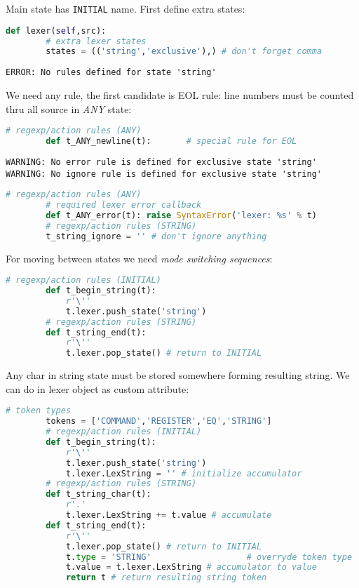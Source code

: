 Main state has \verb|INITIAL| name. First define extra states:
\begin{lstlisting}[language=python]
	def lexer(self,src):
		# extra lexer states
		states = (('string','exclusive'),) # don't forget comma
\end{lstlisting}
\begin{lstlisting}
ERROR: No rules defined for state 'string'
\end{lstlisting}
We need any rule, the first candidate is EOL rule: line numbers
must be counted thru all source in \emph{ANY} state:
\begin{lstlisting}[language=python]
		# regexp/action rules (ANY)
		def t_ANY_newline(t):		# special rule for EOL
\end{lstlisting}
\begin{lstlisting}
WARNING: No error rule is defined for exclusive state 'string'
WARNING: No ignore rule is defined for exclusive state 'string'
\end{lstlisting}
\begin{lstlisting}[language=python]
		# regexp/action rules (ANY)
		# required lexer error callback
		def t_ANY_error(t): raise SyntaxError('lexer: %s' % t)
		# regexp/action rules (STRING)
		t_string_ignore = '' # don't ignore anything
\end{lstlisting}

For moving between states we need \emph{mode switching sequences}:
\begin{lstlisting}[language=python]
		# regexp/action rules (INITIAL)
		def t_begin_string(t):
			r'\''
			t.lexer.push_state('string')
		# regexp/action rules (STRING)
		def t_string_end(t):
			r'\''
			t.lexer.pop_state() # return to INITIAL
\end{lstlisting}

Any char in string state must be stored somewhere forming resulting string. We
can do in lexer object as custom attribute:
\begin{lstlisting}[language=python]
		# token types
		tokens = ['COMMAND','REGISTER','EQ','STRING']
		# regexp/action rules (INITIAL)
		def t_begin_string(t):
			r'\''
			t.lexer.push_state('string')
			t.lexer.LexString = '' # initialize accumulator
		# regexp/action rules (STRING)
		def t_string_char(t):
			r'.'
			t.lexer.LexString += t.value # accumulate
		def t_string_end(t):
			r'\''
			t.lexer.pop_state() # return to INITIAL
			t.type = 'STRING'					# overryde token type
			t.value = t.lexer.LexString # accumulator to value
			return t # return resulting string token
\end{lstlisting}

